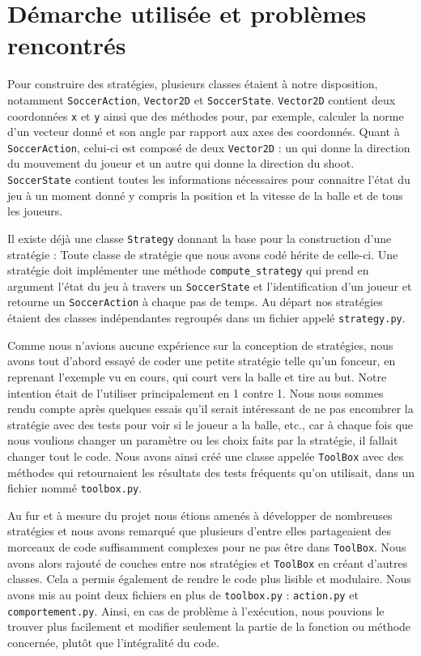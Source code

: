 \documentclass[a4paper,12pt]{article}
\begin{document}
\section{Démarche utilisée et problèmes rencontrés}

Pour construire des stratégies, plusieurs classes étaient à notre disposition, notamment \texttt{SoccerAction}, \texttt{Vector2D} et \texttt{SoccerState}. \texttt{Vector2D} contient deux coordonnées \texttt{x} et \texttt{y} ainsi que des méthodes pour, par exemple, calculer la norme d’un vecteur donné et son angle par rapport aux axes des coordonnés. Quant à \texttt{SoccerAction}, celui-ci est composé de deux \texttt{Vector2D} : un qui donne la direction du mouvement du joueur et un autre qui donne la direction du shoot. \texttt{SoccerState} contient toutes les informations nécessaires pour connaitre l’état du jeu à un moment donné y compris la position et la vitesse de la balle et de tous les joueurs. 

Il existe déjà une classe \texttt{Strategy} donnant la base pour la construction d'une stratégie : Toute classe de stratégie que nous avons codé hérite de celle-ci. Une stratégie doit implémenter une méthode \texttt{compute\_strategy} qui prend en argument l'état du jeu à travers un \texttt{SoccerState} et l'identification d'un joueur et retourne un \texttt{SoccerAction} à chaque pas de temps. Au départ nos stratégies étaient des classes indépendantes regroupés dans un fichier appelé \texttt{strategy.py}.
	
Comme nous n’avions aucune expérience sur la conception de stratégies, nous avons tout d’abord essayé de coder une petite stratégie telle qu’un fonceur, en reprenant l’exemple vu en cours, qui court vers la balle et tire au but. Notre intention était de l’utiliser principalement en 1 contre 1. Nous nous sommes rendu compte après quelques essais qu’il serait intéressant de ne pas encombrer la stratégie avec des tests pour voir si le joueur a la balle, etc., car à chaque fois que nous voulions changer un paramètre ou les choix faits par la stratégie, il fallait changer tout le code. Nous avons ainsi créé une classe appelée \texttt{ToolBox} avec des méthodes qui retournaient les résultats des tests fréquents qu’on utilisait, dans un fichier nommé \texttt{toolbox.py}.

Au fur et à mesure du projet nous étions amenés à développer de nombreuses stratégies et nous avons remarqué que plusieurs d'entre elles partageaient des morceaux de code suffisamment complexes pour ne pas être dans \texttt{ToolBox}. Nous avons alors rajouté de couches entre nos stratégies et \texttt{ToolBox} en créant d'autres classes. Cela a permis également de rendre le code plus lisible et modulaire. Nous avons mis au point deux fichiers en plus de \texttt{toolbox.py} : \texttt{action.py} et \texttt{comportement.py}. Ainsi, en cas de problème à l’exécution, nous pouvions le trouver plus facilement et modifier seulement la partie de la fonction ou méthode concernée, plutôt que l’intégralité du code.
\end{document}
